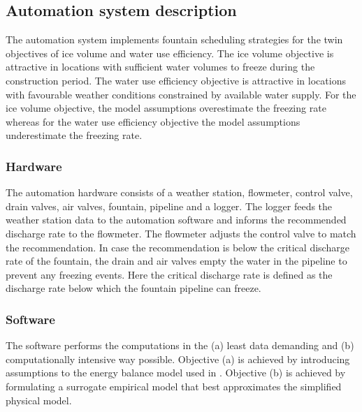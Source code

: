 \documentclass[tc, manuscript]{copernicus}
\begin{document}
\subsection{Automation system description}

The automation system implements fountain scheduling strategies for the twin objectives of ice volume and water
use efficiency. The ice volume objective is attractive in locations with sufficient water volumes to freeze
during the construction period. The water use efficiency objective is attractive in locations with favourable
weather conditions constrained by available water supply. For the ice volume objective, the model assumptions
overestimate the freezing rate whereas for the water use efficiency objective the model assumptions
underestimate the freezing rate. 

\subsubsection{Hardware}
The automation hardware consists of a weather station, flowmeter, control valve, drain valves, air valves,
fountain, pipeline and a logger. The logger feeds the weather station data to the automation software and
informs the recommended discharge rate to the flowmeter. The flowmeter adjusts the control valve to match the
recommendation. In case the recommendation is below the critical discharge rate of the fountain, the drain and
air valves empty the water in the pipeline to prevent any freezing events. Here the critical discharge rate is
defined as the discharge rate below which the fountain pipeline can freeze.


\subsubsection{Software}


The software performs the computations in the (a) least data demanding and (b) computationally intensive way
possible. Objective (a) is achieved by introducing assumptions to the energy balance model used in
\cite{balasubramanianInfluenceMeteorologicalConditions2022}. Objective (b) is achieved by formulating a
surrogate empirical model that best approximates the simplified physical model. 
\end{document}
